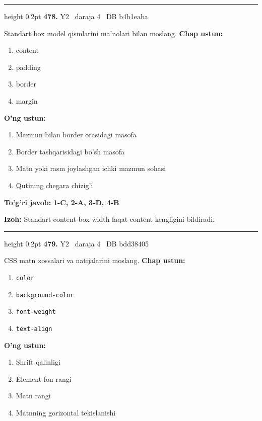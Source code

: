 \documentclass[10pt,a4paper,oneside]{article}
\begin{document}
\vspace{2mm}\hrule height 0.2pt \vspace{4mm}
\hypertarget{q478}{\textbf{\color{ink}478.}}  {\color{muted}\scriptsize Y2 \textbullet\ daraja 4 \textbullet\ DB b4b1eaba}
\par
Standart box model qismlarini ma'nolari bilan moslang.
\textbf{\footnotesize Chap ustun:}
\begin{enumerate}[label=\arabic*),leftmargin=9mm]
\item content
\item padding
\item border
\item margin
\end{enumerate}
\textbf{\footnotesize O'ng ustun:}
\begin{enumerate}[label=\Alph*),leftmargin=9mm]
\item Mazmun bilan border orasidagi masofa
\item Border tashqarisidagi bo'sh masofa
\item Matn yoki rasm joylashgan ichki mazmun sohasi
\item Qutining chegara chizig'i
\end{enumerate}
\begin{tcolorbox}[enhanced,breakable,colback=teal!4,colframe=teal!45!black,boxrule=0.45pt,arc=1.2mm,left=2.8mm,right=2.8mm,top=2mm,bottom=2mm,before skip=2mm,after skip=2mm]
\textbf{\color{teal}To'g'ri javob:} \textbf{1-C, 2-A, 3-D, 4-B}
\par\smallskip
\textbf{Izoh:} Standart content-box width faqat content kengligini bildiradi.
\end{tcolorbox}
\vspace{2mm}\hrule height 0.2pt \vspace{4mm}
\hypertarget{q479}{\textbf{\color{ink}479.}}  {\color{muted}\scriptsize Y2 \textbullet\ daraja 4 \textbullet\ DB bdd38405}
\par
CSS matn xossalari va natijalarini moslang.
\textbf{\footnotesize Chap ustun:}
\begin{enumerate}[label=\arabic*),leftmargin=9mm]
\item \texttt{color}
\item \texttt{background-color}
\item \texttt{font-weight}
\item \texttt{text-align}
\end{enumerate}
\textbf{\footnotesize O'ng ustun:}
\begin{enumerate}[label=\Alph*),leftmargin=9mm]
\item Shrift qalinligi
\item Element fon rangi
\item Matn rangi
\item Matnning gorizontal tekislanishi
\end{enumerate}
\end{document}
